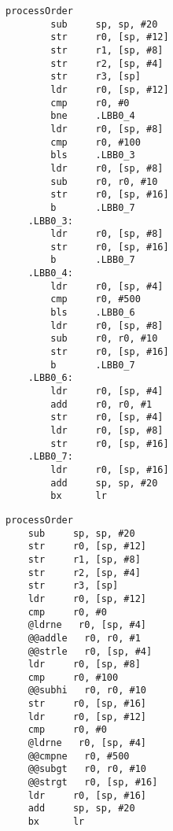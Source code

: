 \begin{minipage}{0.45\textwidth}
    \begin{lstlisting}[style=AsmStyle]
    processOrder
        sub     sp, sp, #20
        str     r0, [sp, #12]
        str     r1, [sp, #8]
        str     r2, [sp, #4]
        str     r3, [sp]
        ldr     r0, [sp, #12]
        cmp     r0, #0
        bne     .LBB0_4
        ldr     r0, [sp, #8]
        cmp     r0, #100
        bls     .LBB0_3
        ldr     r0, [sp, #8]
        sub     r0, r0, #10
        str     r0, [sp, #16]
        b       .LBB0_7
    .LBB0_3:
        ldr     r0, [sp, #8]
        str     r0, [sp, #16]
        b       .LBB0_7
    .LBB0_4:
        ldr     r0, [sp, #4]
        cmp     r0, #500
        bls     .LBB0_6
        ldr     r0, [sp, #8]
        sub     r0, r0, #10
        str     r0, [sp, #16]
        b       .LBB0_7
    .LBB0_6:
        ldr     r0, [sp, #4]
        add     r0, r0, #1
        str     r0, [sp, #4]
        ldr     r0, [sp, #8]
        str     r0, [sp, #16]
    .LBB0_7:
        ldr     r0, [sp, #16]
        add     sp, sp, #20
        bx      lr
    \end{lstlisting}
\end{minipage}%
\hspace{1cm}
\begin{minipage}{0.45\textwidth}
    \begin{lstlisting}[style=AsmStyle, numbers=right, belowskip=14.5\baselineskip]
processOrder
    sub     sp, sp, #20
    str     r0, [sp, #12]
    str     r1, [sp, #8]
    str     r2, [sp, #4]
    str     r3, [sp]
    ldr     r0, [sp, #12]
    cmp     r0, #0
    @ldrne   r0, [sp, #4]
    @@addle   r0, r0, #1
    @@strle   r0, [sp, #4]
    ldr     r0, [sp, #8]
    cmp     r0, #100
    @@subhi   r0, r0, #10
    str     r0, [sp, #16]
    ldr     r0, [sp, #12]
    cmp     r0, #0
    @ldrne   r0, [sp, #4]
    @@cmpne   r0, #500
    @@subgt   r0, r0, #10
    @@strgt   r0, [sp, #16]
    ldr     r0, [sp, #16]
    add     sp, sp, #20
    bx      lr  
    \end{lstlisting}
\end{minipage}%